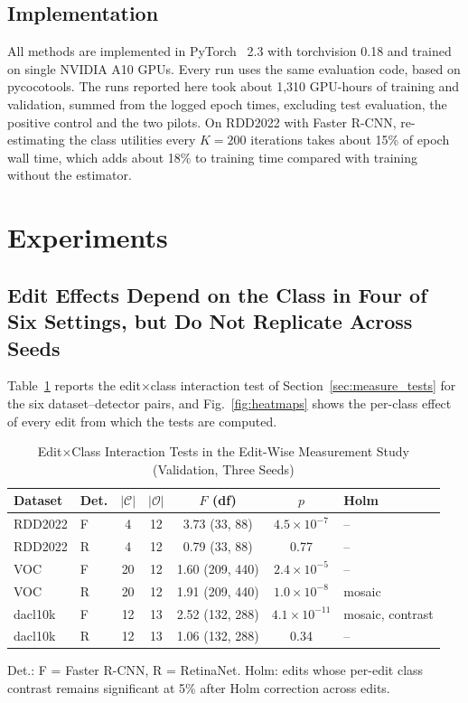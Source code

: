 \documentclass[conference]{IEEEtran}
\begin{document}
\subsection{Implementation}
\label{sec:setup_impl}

All methods are implemented in PyTorch~\cite{paszke2019pytorch} 2.3 with torchvision 0.18 and trained on single NVIDIA A10 GPUs. Every run uses the same evaluation code, based on pycocotools. The runs reported here took about 1,310 GPU-hours of training and validation, summed from the logged epoch times, excluding test evaluation, the positive control and the two pilots. On RDD2022 with Faster R-CNN, re-estimating the class utilities every $K=200$ iterations takes about 15\% of epoch wall time, which adds about 18\% to training time compared with training without the estimator.


\section{Experiments}
\label{sec:results}

\subsection{Edit Effects Depend on the Class in Four of Six Settings, but Do Not Replicate Across Seeds}
\label{sec:results_measurement}

Table~\ref{tab:interaction} reports the edit$\times$class interaction test of Section~\ref{sec:measure_tests} for the six dataset--detector pairs, and Fig.~\ref{fig:heatmaps} shows the per-class effect of every edit from which the tests are computed.

\begin{table}[t]
\caption{Edit$\times$Class Interaction Tests in the Edit-Wise Measurement Study (Validation, Three Seeds)}
\label{tab:interaction}
\centering
\footnotesize
\setlength{\tabcolsep}{2.6pt}
\begin{tabular}{@{}llccccl@{}}
\toprule
\textbf{Dataset} & \textbf{Det.} & $|\mathcal{C}|$ & $|\mathcal{O}|$ & $F$ (df) & $p$ & \textbf{Holm} \\
\midrule
RDD2022 & F & 4 & 12 & 3.73 (33, 88) & $4.5\times10^{-7}$ & -- \\
RDD2022 & R & 4 & 12 & 0.79 (33, 88) & 0.77 & -- \\
VOC & F & 20 & 12 & 1.60 (209, 440) & $2.4\times10^{-5}$ & -- \\
VOC & R & 20 & 12 & 1.91 (209, 440) & $1.0\times10^{-8}$ & mosaic \\
dacl10k & F & 12 & 13 & 2.52 (132, 288) & $4.1\times10^{-11}$ & mosaic, contrast \\
dacl10k & R & 12 & 13 & 1.06 (132, 288) & 0.34 & -- \\
\bottomrule
\end{tabular}
\vspace{2pt}

\parbox{\columnwidth}{\footnotesize Det.: F = Faster R-CNN, R = RetinaNet. Holm: edits whose per-edit class contrast remains significant at 5\% after Holm correction across edits.}
\end{table}
\end{document}
